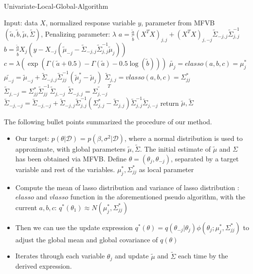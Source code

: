 \newpage
\begin{algorithm}
	\caption{Univariate-Local-Global-Algorithm}
	\begin{algorithmic}[1]
		
    \State Input: data $X$, normalized response variable $y$, parameter from MFVB $(\tilde{a},\tilde{b},\tilde{\mu},\tilde{\Sigma})$, Penalizing parameter: $\lambda$
	\State $a = \frac{\tilde{a}}{\tilde{b}}(X^TX)_{j,j} + (X^TX)_{j,-j}\tilde{\Sigma}_{-j,j}\tilde{\Sigma}_{j,j}^{-1}$ 
	\State $b = \frac{\tilde{a}}{\tilde{b}}  X_{j}(y-X_{-j}(\tilde{\mu}_{-j} - \tilde{\Sigma}_{-j,j}\tilde{\Sigma}_{j,j}^{-1}\tilde{\mu}_j))       $ 
	\State $c = \lambda (\exp(\Gamma(\tilde{a}+0.5) - \Gamma(\tilde{a}) - 0.5\log(\tilde{b})))  $ 
	\State $\tilde{\mu_{j}} =  elasso(a,b,c) = \mu_j ^*$ 
	\State $\tilde{\mu_{-j}} = \tilde{\mu}_{-j} +  \tilde{\Sigma}_{-j,j}\tilde{\Sigma}^{-1}_{jj}(\tilde{\mu}_j^*-\tilde{\mu}_j)$ 
	\State $\tilde{\Sigma}_{j,j} = vlasso(a,b,c) = \Sigma_{jj}^*$ 
	\State $\tilde{\Sigma}_{j,-j} = \Sigma_{jj}^*  \tilde{\Sigma}_{jj}^{-1}\tilde{\Sigma}_{j,-j} $ 
	\State $\tilde{\Sigma}_{-j,j} = \tilde{\Sigma_{j,-j}}^T$ 
	\State $\tilde{\Sigma}_{-j,-j} = \tilde{\Sigma}_{-j,-j} + \tilde{\Sigma}_{-j,j}\tilde{\Sigma}_{j,j}^{-1}(\Sigma_{j,j}^{*} - \tilde{\Sigma}_{j,j})\tilde{\Sigma}_{j,j}^{-1}\tilde{\Sigma}_{j,-j}$ 		
	\EndFor
	\EndWhile
	\State return $\tilde{\mu},\tilde{\Sigma}$
	\end{algorithmic}
\end{algorithm}


The following bullet points summarized the procedure of our method.
\begin{itemize}
	\item Our target: $p(\theta|\mathcal{D})$ = $p(\beta, \sigma^2|\mathcal{D})$, where a normal distribution is used to approximate, with global parameters $\tilde{\mu},\tilde{\Sigma}$. The initial estimate of $\tilde{\mu}$ and $\Sigma$ has been obtained via MFVB. Define $\theta = (\theta_j,\theta_{-j})$, separated by a target variable and rest of the variables. $\mu_{j}^*, \Sigma_{jj}^*$ as local parameter
	
	
	\item Compute the mean of lasso distribution and variance of lasso distribution : $elasso$ and $vlasso$ function in the aforementioned pseudo algorithm, with the current $a,b,c$: $q^*(\theta_1) \approx N(\mu_j^*,\Sigma_{jj}^*)$
	\item Then we can use the update expression $q^*(\theta) = q(\theta_{-j}|\theta_j)\phi(\theta_j;\mu_j^*,\Sigma_{jj}^*)$ to adjust the global mean and global covariance of $q(\theta)$
	\item Iterates through each variable $\theta_j$ and update $\tilde{\mu}$ and $\tilde{\Sigma}$ each time by the derived expression.
\end{itemize}


